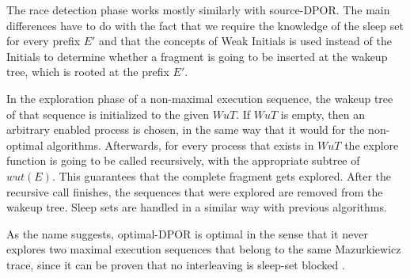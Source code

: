 The race detection phase works mostly similarly with source-DPOR. The main differences have to do with the fact that
we require the knowledge of the sleep set for every prefix $E'$ and that the concepts of Weak Initials is used instead of
the Initials to determine whether a fragment is going to be inserted at the wakeup tree, which is rooted at the prefix $E'$.

In the exploration phase of a non-maximal execution sequence, the wakeup tree of that sequence is initialized to the 
given $WuT$. If $WuT$ is empty, then an arbitrary enabled process is chosen, in the same way that it would for the non-optimal algorithms.
Afterwards, for every process that exists in $WuT$ the explore function is going to be called recursively, with the appropriate
subtree of $wut(E)$. This guarantees that the complete fragment gets explored. After the recursive call finishes,
the sequences that were explored are removed from the wakeup tree. Sleep sets are handled in a similar way with previous 
algorithms.

As the name suggests, optimal-DPOR is optimal in the sense that it never explores two maximal execution sequences
that belong to the same Mazurkiewicz trace, since it can be proven that no interleaving is sleep-set blocked
\cite{AbdullaAronisJohnssonSagonasDPOR2014}.